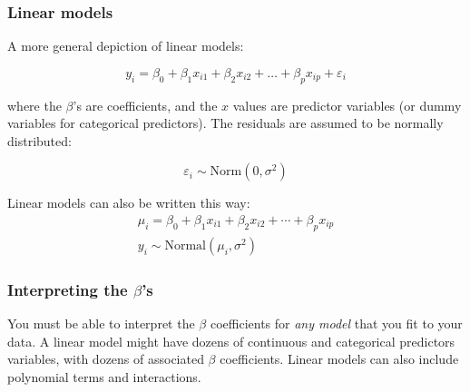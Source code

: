 \documentclass[color=usenames,dvipsnames]{beamer}\usepackage[]{graphicx}\usepackage[]{color}
\begin{document}
\begin{frame}
  \frametitle{Linear models}
    A more general depiction of linear models:

\[
y_i = \beta_0 + \beta_1 x_{i1} + \beta_2 x_{i2} + \ldots + \beta_p x_{ip} + \varepsilon_i
\]

where the $\beta$'s are coefficients, and the $x$ values are predictor
variables (or dummy variables for categorical predictors). %
The residuals are assumed to be normally distributed:

\[
  \varepsilon_i \sim \mathrm{Norm}(0, \sigma^2)
\]

\pause

\vfill %



Linear models can also be written this way:
\begin{gather*}
  \mu_i = \beta_0 + \beta_1 x_{i1} + \beta_2 x_{i2} + \cdots + \beta_p x_{ip} \\
  y_i \sim \mathrm{Normal}(\mu_i, \sigma^2)
\end{gather*}

\end{frame}




\begin{frame}
  \frametitle{Interpreting the $\beta$'s}
You must be able to interpret the $\beta$
coefficients for {\it any model} that you fit to your data.
\pause
\vfill
A linear model might have dozens of continuous and categorical
predictors variables, with dozens of associated $\beta$ coefficients.
\pause
\vfill
Linear models can also include polynomial terms and interactions. 
\end{frame}
\end{document}
